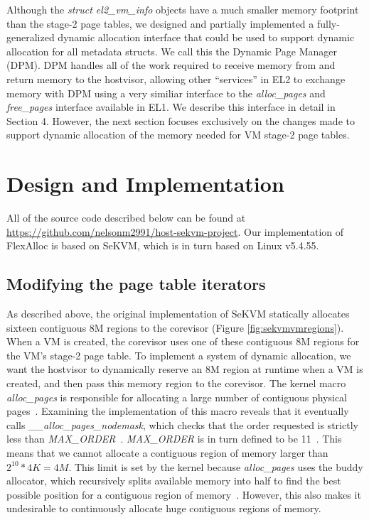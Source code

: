 Although the \textit{struct el2\_vm\_info} objects have a much smaller memory footprint than the stage-2 page tables,
we designed and partially implemented a fully-generalized dynamic allocation interface that
could be used to support dynamic allocation for all metadata structs. We call this the
Dynamic Page Manager (DPM). DPM handles all of the work required to receive memory from and return
memory to the hostvisor, allowing other ``services'' in EL2 to exchange memory with DPM using
a very similiar interface to the \textit{alloc\_pages} and \textit{free\_pages} interface available in EL1. We describe
this interface in detail in Section 4. However, the next section focuses
exclusively on the changes made to support dynamic allocation of the memory
needed for VM stage-2 page tables.

\section{Design and Implementation}

All of the source code described below can be found at \url{https://github.com/nelsonm2991/host-sekvm-project}.
Our implementation of FlexAlloc is based on SeKVM, which is in turn based on Linux v5.4.55.

\subsection{Modifying the page table iterators}

As described above, the original implementation of SeKVM statically
allocates sixteen contiguous 8M regions to the corevisor (Figure \ref{fig:sekvmvmregions}). When a VM is created,
the corevisor uses one of these contiguous 8M regions for the VM's stage-2
page table. To implement a system of dynamic allocation, we want the hostvisor
to dynamically reserve an 8M region at runtime when a VM is created, and then
pass this memory region to the corevisor. The kernel macro \textit{alloc\_pages}
is responsible for allocating a large number of contiguous physical pages~\cite{kerneldocs}.
Examining the implementation of this macro reveals that it eventually
calls \textit{\_\_alloc\_pages\_nodemask}, which checks that the order requested
is strictly less than \textit{MAX\_ORDER}~\cite{page_alloc.c}. \textit{MAX\_ORDER}
is in turn defined to be 11~\cite{mmzone.h}. This means that we cannot allocate
a contiguous region of memory larger than $2^{10} * 4K = 4M$. This
limit is set by the kernel because \textit{alloc\_pages} uses the buddy allocator,
which recursively splits available memory into half to find the best possible position for
a contiguous region of memory~\cite{kerneldocs}. However, this also makes it
undesirable to continuously allocate huge contiguous regions of memory.

